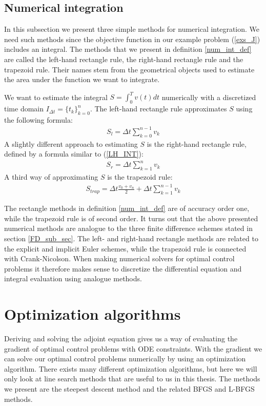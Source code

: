\subsection{Numerical integration} \label{num_int_sub_sec}
In this subsection we present three simple methods for numerical integration. We need such methods since the objective function in our example problem (\ref{exs_J}) includes an integral. The methods that we present in definition \ref{num_int_def} are called the left-hand rectangle rule, the right-hand rectangle rule and the trapezoid rule. Their names stem from the geometrical objects used to estimate the area under the function we want to integrate.
\begin{definition} \label{num_int_def}
We want to estimate the integral $S=\int_0^T v(t) dt$ numerically with a discretized time domain $I_{\Delta t}=\{t_k\}_{k=0}^{n}$. The left-hand rectangle rule approximates $S$ using the following formula:
\begin{align}
S_l = \Delta t\sum_{k=0}^{n-1} v_k \label{LH_INT}
\end{align}
A slightly different approach to estimating $S$ is the right-hand rectangle rule, defined by a formula similar to (\ref{LH_INT}): 
\begin{align}
S_r = \Delta t\sum_{k=1}^{n} v_k \label{RH_INT}
\end{align}
A third way of approximating $S$ is the trapezoid rule:
\begin{align}
S_{trap} = \Delta t\frac{v_0+v_n}{2}+\Delta t\sum_{k=1}^{n-1} v_k \label{TRAP_INT}
\end{align}
\end{definition}
\noindent
The rectangle methods in definition \ref{num_int_def} are of accuracy order one, while the trapezoid rule is of second order. It turns out that the above presented numerical methods are analogue to the three finite difference schemes stated in section \ref{FD_sub_sec}. The left- and right-hand rectangle methods are related to the explicit and implicit Euler schemes, while the trapezoid rule is connected with Crank-Nicolson. When making numerical solvers for optimal control problems it therefore makes sense to discretize the differential equation and integral evaluation using analogue methods. 
\section{Optimization algorithms}
Deriving and solving the adjoint equation gives us a way of evaluating the gradient of optimal control problems with ODE constraints. With the gradient we can solve our optimal control problems numerically by using an optimization algorithm. There exists many different optimization algorithms, but here we will only look at line search methods that are useful to us in this thesis. The methods we present are the steepest descent method and the related BFGS and L-BFGS methods.  
